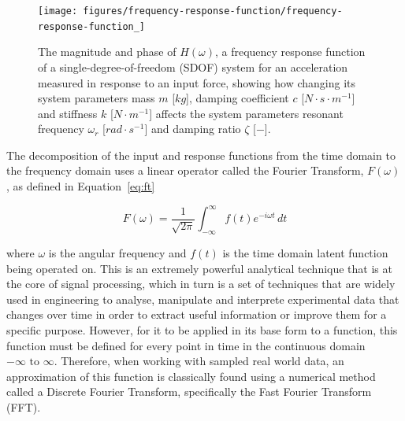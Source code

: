 \documentclass[12pt]{article}
\begin{document}
    \begin{figure}[ht]
        \centering
        \texttt{[image: figures/frequency-response-function/frequency-response-function\_]}
        \caption{The magnitude and phase of $H(\omega)$, a frequency response function of a single-degree-of-freedom (SDOF) system for an acceleration measured in response to an input force, showing how changing its system parameters mass $m$ [$kg$], damping coefficient $c$ [$N \cdot s \cdot m^{-1}$] and stiffness $k$ [$N \cdot m^{-1}$] affects the system parameters resonant frequency $\omega_r$ [$rad \cdot s^{-1}$] and damping ratio $\zeta$ [$-$].}
        \label{fig:frequency-response-function}
    \end{figure}

    The decomposition of the input and response functions from the time domain to the frequency domain uses a linear operator called the Fourier Transform, $F(\omega)$, as defined in Equation~\ref{eq:ft}

    \begin{equation}
        F(\omega) = \frac{1}{\sqrt{2 \pi}} \int_{-\infty}^{\infty} f(t) e^{-i \omega t} \, dt\label{eq:ft}
    \end{equation}


    \noindent where $\omega$ is the angular frequency and $f(t)$ is the time domain latent function being operated on.
    This is an extremely powerful analytical technique that is at the core of signal processing, which in turn is a set of techniques that are widely used in engineering to analyse, manipulate and interprete experimental data that changes over time in order to extract useful information or improve them for a specific purpose.
    However, for it to be applied in its base form to a function, this function must be defined for every point in time in the continuous domain $-\infty \text{ to } \infty$.
    Therefore, when working with sampled real world data, an approximation of this function is classically found using a numerical method called a Discrete Fourier Transform, specifically the Fast Fourier Transform (FFT).
\end{document}
